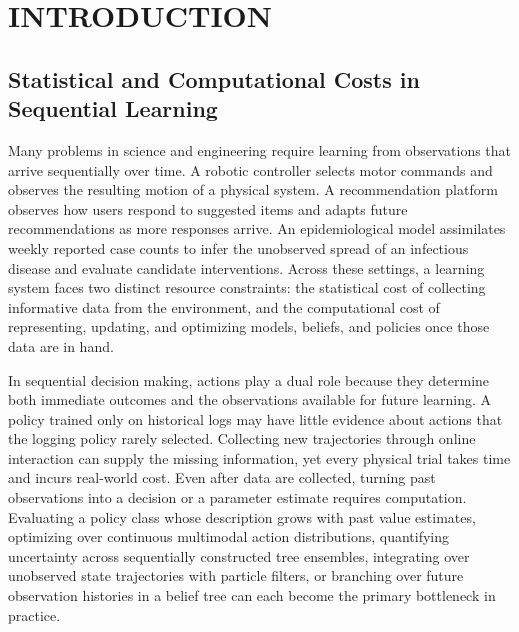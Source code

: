 \chapter{INTRODUCTION}
\label{ch:introduction}


\begin{aigenblock}

\section{Statistical and Computational Costs in Sequential Learning}

Many problems in science and engineering require learning from observations that arrive sequentially over time. A robotic controller selects motor commands and observes the resulting motion of a physical system. A recommendation platform observes how users respond to suggested items and adapts future recommendations as more responses arrive. An epidemiological model assimilates weekly reported case counts to infer the unobserved spread of an infectious disease and evaluate candidate interventions. Across these settings, a learning system faces two distinct resource constraints: the statistical cost of collecting informative data from the environment, and the computational cost of representing, updating, and optimizing models, beliefs, and policies once those data are in hand.

In sequential decision making, actions play a dual role because they determine both immediate outcomes and the observations available for future learning. A policy trained only on historical logs may have little evidence about actions that the logging policy rarely selected. Collecting new trajectories through online interaction can supply the missing information, yet every physical trial takes time and incurs real-world cost. Even after data are collected, turning past observations into a decision or a parameter estimate requires computation. Evaluating a policy class whose description grows with past value estimates, optimizing over continuous multimodal action distributions, quantifying uncertainty across sequentially constructed tree ensembles, integrating over unobserved state trajectories with particle filters, or branching over future observation histories in a belief tree can each become the primary bottleneck in practice.


\end{aigenblock}
